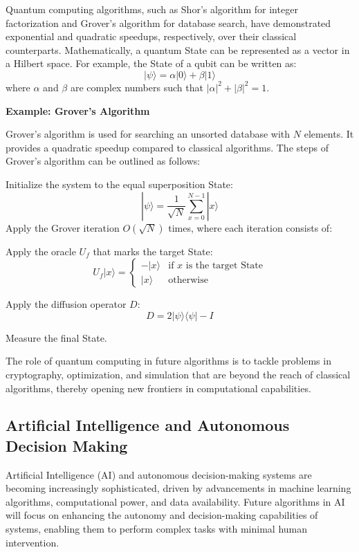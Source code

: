 \documentclass[12pt]{book} %
\begin{document}
Quantum computing algorithms, such as Shor's algorithm for integer factorization and Grover's algorithm for database search, have demonstrated exponential and quadratic speedups, respectively, over their classical counterparts. Mathematically, a quantum State can be represented as a vector in a Hilbert space. For example, the State of a qubit can be written as:
\[
|\psi\rangle = \alpha |0\rangle + \beta |1\rangle
\]
where \(\alpha\) and \(\beta\) are complex numbers such that \(|\alpha|^2 + |\beta|^2 = 1\).

\textbf{Example: Grover's Algorithm}

Grover's algorithm is used for searching an unsorted database with \(N\) elements. It provides a quadratic speedup compared to classical algorithms. The steps of Grover's algorithm can be outlined as follows:
\FloatBarrier
\begin{algorithm}
\caption{Grover's Algorithm}
\begin{algorithmic}[1]
\State Initialize the system to the equal superposition State:
\[
|\psi\rangle = \frac{1}{\sqrt{N}} \sum_{x=0}^{N-1} |x\rangle
\]
\State Apply the Grover iteration \(O(\sqrt{N})\) times, where each iteration consists of:
\begin{item}
    \item Apply the oracle \(U_f\) that marks the target State:
    \[
    U_f |x\rangle = 
    \begin{cases} 
    -|x\rangle & \text{if } x \text{ is the target State} \\
    |x\rangle & \text{otherwise}
    \end{cases}
    \]
    \item Apply the diffusion operator \(D\):
    \[
    D = 2|\psi\rangle\langle\psi| - I
    \]
\end{item}
\State Measure the final State.
\end{algorithmic}
\end{algorithm}
\FloatBarrier
The role of quantum computing in future algorithms is to tackle problems in cryptography, optimization, and simulation that are beyond the reach of classical algorithms, thereby opening new frontiers in computational capabilities.

\subsection{Artificial Intelligence and Autonomous Decision Making}
Artificial Intelligence (AI) and autonomous decision-making systems are becoming increasingly sophisticated, driven by advancements in machine learning algorithms, computational power, and data availability. Future algorithms in AI will focus on enhancing the autonomy and decision-making capabilities of systems, enabling them to perform complex tasks with minimal human intervention.
\end{document}
